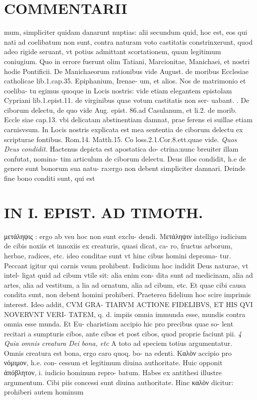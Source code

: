 \documentclass{article}
\begin{document}
\begin{pages}
\section*{COMMENTARII }
\marginpar{[ p.90 ]}\pstart mum, simpliciter quidam danarunt nuptias: alii secundum quid, hoc est, eos qui nati ad coelibatum non sunt, contra naturam voto castitatis constrinxerunt, quod adeo rigide seruant, vt potius admittant scortationem, quam legitimum coniugium. Quo in errore fuerunt olim Tatiani, Marcionitae, Manichaei, et nostri hodie Pontificii. De Manichaeorum rationibus vide August. de moribus Ecclesiae catholicae lib.1.cap.35. Epiphanium, Irenae- um, et alios. Nos de matrimonio et coeliba- tu egimus quoque in Locis nostris: vide etiam elegantem epistolam Cypriani lib.1.epist.11. de virginibus quae votum castitatis non ser- uabant.  \pend{}. De ciborum delectu, de quo vide Aug. epist. 86.ad Casulanum, et li.2. de morib. Eccle siae cap.13. vbi delicatam abstinentiam damnat, prae ferens ei suillae etiam carnisvsum. In Locis nostris explicata est mea sententia de ciborum delectu ex scripturae fontibus. Rom.14. Matth.15. Co loss.2.1.Cor.8.ett.quae vide.  \pend
\textit{Quos Deus condidit. }\pstart Hactenus depicta est apostatica do- ctrina:nunc breuiter illam confutat, nomina- tim articulum de ciborum delectu. Deus illos condidit, h.e de genere sunt bonorum sua natu- ra:ergo non debent simpliciter damnari.  \pend\pstart Deinde fine bono conditi sunt, qui est  \pend
\section*{IN I. EPIST. AD TIMOTH. }
\marginpar{[ p.91 ]}\pstart μετάληψις : ergo ab vsu hoc non sunt exclu- dendi. Μετάληψιν intelligo iudicium de cibis noxiis et innoxiis ex creaturis, quasi dicat, ca- ro, fructus arborum, herbae, radices, etc. ideo conditae sunt vt hinc cibus homini deproma- tur. Peccant igitur qui carnis vsum prohibent. Iudicium hoc indidit Deus naturae, vt intel- ligat quid ad cibum vtile sit: alia enim con- dita sunt ad medicinam, alia ad artes, alia ad vestitum, a lia ad ornatum, alia ad cibum, etc. Et quae cibi causa condita sunt, non debent homini prohiberi. Praeterea fidelium hoc scire imprimis interest. Ideo addit, CVM GRA- TIARVM ACTIONE FIDELIBVS, ET HIS QVI NOVERVNT VERI- TATEM, q. d. impiis omnia immunda esse, mundis contra omnia esse munda. Et Eu- charistiam accipio hic pro precibus quae so- lent recitari a sumpturis cibos, ante cibos et post cibos, quod proprie faciunt pii.  \pend
\textit{4 Quia omnis creatura Dei bona, etc }\pstart A toto ad speciem totius argumentatur. Omnis creatura est bona, ergo caro quoq. bo- na edenti. Καλὸν accipio pro νόμιμον, h.e. con- cessum et legitimum diuina authoritate. Huic opponit ἀπόβλητον, i. iudicio hominum repro- batum. Habes ex antithesi illustre argumentum. Cibi piis concessi sunt diuina authoritate. Hinc καλὸν dicitur: prohiberi autem hominum  \pend

\end{pages}
\end{document}

